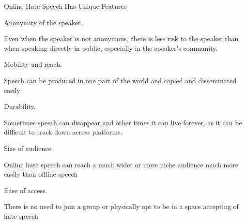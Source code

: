 \documentclass[nobackground,dvipsnames,table]{beamer}
\begin{document}
\begin{frame}{Online Hate Speech Has Unique Features}
\begin{itemize}
    \footnotesize{
    \item Anonymity of the speaker. 
    \begin{itemize}
        \footnotesize{
        \item Even when the speaker is not anonymous, there is less risk to the speaker than when speaking directly in public, especially in the speaker’s community. }
    \end{itemize}

    \item Mobility and reach. 
    \begin{itemize}
        \footnotesize{
        \item Speech can be produced in one part of the world and copied and disseminated easily }
    \end{itemize}

    \item Durability. 
    \begin{itemize}
        \footnotesize{
        \item Sometimes speech can disappear and other times it can live forever, as it can be difficult to track down across platforms. 
        }
    \end{itemize}

    \item Size of audience. 
    \begin{itemize}
        \footnotesize{
        \item Online hate speech can reach a much wider or more niche audience much more easily than offline speech }
    \end{itemize}

    \item Ease of access. 
    \begin{itemize}
    \footnotesize{
        \item There is no need to join a group or physically opt to be in a space accepting of hate speech}
    \end{itemize}
    }
\end{itemize}


\end{frame}
\end{document}
